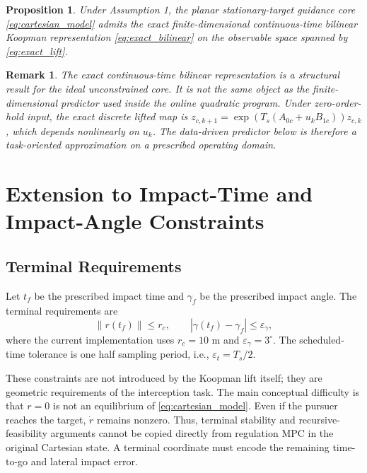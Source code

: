 \documentclass[letterpaper,journal]{IEEEtran}
\newtheorem{proposition}{Proposition}
\newtheorem{remark}{Remark}
\begin{document}
\begin{proposition}
Under Assumption 1, the planar stationary-target guidance core \eqref{eq:cartesian_model} admits the exact finite-dimensional continuous-time bilinear Koopman representation \eqref{eq:exact_bilinear} on the observable space spanned by \eqref{eq:exact_lift}.
\end{proposition}

\begin{remark}
The exact continuous-time bilinear representation is a structural result for the ideal unconstrained core. It is not the same object as the finite-dimensional predictor used inside the online quadratic program. Under zero-order-hold input, the exact discrete lifted map is $z_{c,k+1}=\exp(T_s(A_{0c}+u_kB_{1c}))z_{c,k}$, which depends nonlinearly on $u_k$. The data-driven predictor below is therefore a task-oriented approximation on a prescribed operating domain.
\end{remark}

\section{Extension to Impact-Time and Impact-Angle Constraints}

\subsection{Terminal Requirements}
Let $t_f$ be the prescribed impact time and $\gamma_f$ be the prescribed impact angle. The terminal requirements are
\begin{equation}
    \|r(t_f)\|\le r_c,\qquad
    |\gamma(t_f)-\gamma_f|\le \varepsilon_\gamma ,
    \label{eq:terminal_requirements}
\end{equation}
where the current implementation uses $r_c=10$ m and $\varepsilon_\gamma=3^\circ$. The scheduled-time tolerance is one half sampling period, i.e., $\varepsilon_t=T_s/2$.

These constraints are not introduced by the Koopman lift itself; they are geometric requirements of the interception task. The main conceptual difficulty is that $r=0$ is not an equilibrium of \eqref{eq:cartesian_model}. Even if the pursuer reaches the target, $\dot r$ remains nonzero. Thus, terminal stability and recursive-feasibility arguments cannot be copied directly from regulation MPC in the original Cartesian state. A terminal coordinate must encode the remaining time-to-go and lateral impact error.
\end{document}

